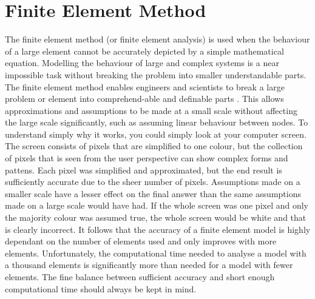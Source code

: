 \section{Finite Element Method}\label{femsec}
The finite element method (or finite element analysis) is  used when the behaviour of a large element cannot be accurately depicted by a simple mathematical equation. 
Modelling the behaviour of large and complex systems is a near impossible task without breaking the problem into smaller understandable parts.
The finite element method enables engineers and scientists to break a large problem or element into comprehend-able and definable parts \citep{Zienkiewicz:2000}. 
This allows approximations and assumptions to be made at a small scale without affecting the large scale significantly, such as assuming linear behaviour between nodes. 
To understand simply why it works, you could simply look at your computer screen.
The screen consists of pixels that are simplified to one colour, but the collection of pixels that is seen from the user perspective can show complex forms and pattens.
Each pixel was simplified and approximated, but the end result is sufficiently accurate due to the sheer number of pixels.
Assumptions made on a smaller scale have a lesser effect on the final answer than the same assumptions made on a large scale would have had.
If the whole screen was one pixel and only the majority colour was assumed true, the whole screen would be white and that is clearly incorrect.
It follows that the accuracy of a finite element model is highly dependant on the number of elements used and only improves with more elements.
Unfortunately, the computational time needed to analyse a model with a thousand elements is significantly more than needed for a model with fewer elements.
The fine balance between sufficient accuracy and short enough computational time should always be kept in mind.


